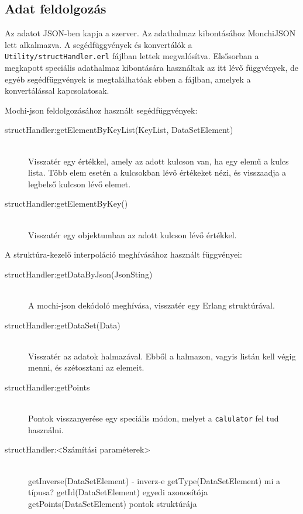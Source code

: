 \subsection{Adat feldolgozás}
	Az adatot JSON-ben kapja a szerver. Az adathalmaz kibontásához MonchiJSON lett alkalmazva. 
	A segédfüggvények és konvertálók a \texttt{Utility/structHandler.erl} fájlban lettek megvalósítva.\newline
	Elsősorban a megkapott speciális adathalmaz kibontására használtak az itt lévő függvények, de egyéb segédfüggvények is megtalálhatóak ebben a fájlban, amelyek a konvertálással kapcsolatosak.

	Mochi-json feldolgozásához használt segédfüggvények:
	\begin{description}
		\item[structHandler:getElementByKeyList(KeyList, DataSetElement)] \hfill \\ 
		Visszatér egy értékkel, amely az adott kulcson van, ha egy elemű a kulcs lista. Több elem esetén a kulcsokban lévő értékeket nézi, és visszaadja a legbelső kulcson lévő elemet.

		\item[structHandler:getElementByKey()] \hfill \\ 
		Visszatér egy objektumban az adott kulcson lévő értékkel.
	\end{description}
	A struktúra-kezelő interpoláció meghívásához használt függvényei:
	\begin{description}

		\item[structHandler:getDataByJson(JsonSting)] \hfill \\
		A mochi-json dekódoló meghívása, visszatér egy Erlang struktúrával.
		
		\item[structHandler:getDataSet(Data)]\hfill \\ 
		Visszatér az adatok halmazával. Ebből a halmazon, vagyis listán kell végig menni, és szétosztani az elemeit. 
		
		\item[structHandler:getPoints] \hfill \\
		Pontok visszanyerése egy speciális módon, melyet a \texttt{calulator} fel tud használni.

		

		\item[structHandler:<Számítási paraméterek>] \hfill \\ 
		getInverse(DataSetElement) - inverz-e \newline
		getType(DataSetElement) mi a típusa? \newline
		getId(DataSetElement) egyedi azonosítója \newline
		getPoints(DataSetElement) pontok struktúrája
	\end{description}
